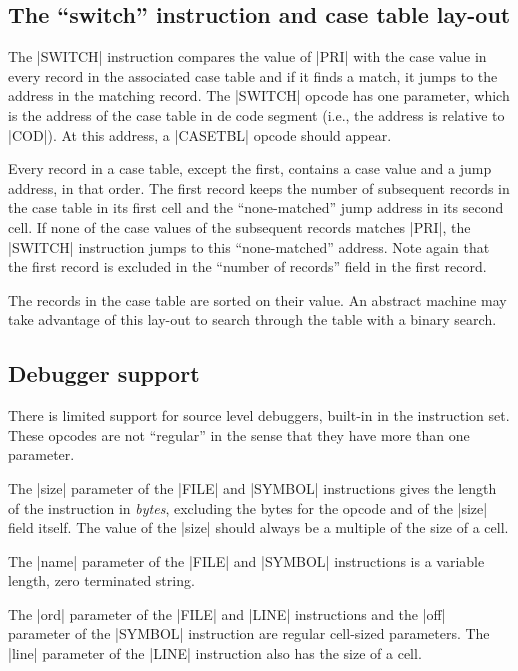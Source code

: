 \subsection{The ``switch'' instruction and case table lay-out}
The |SWITCH| instruction compares the value of |PRI| with the case value in
every record in the associated case table and if it finds a match, it jumps
to the address in the matching record. The |SWITCH| opcode has one parameter,
which is the address of the case table in de code segment (i.e., the address
is relative to |COD|). At this address, a |CASETBL| opcode should appear.

Every record in a case table, except the first, contains a case value and
a jump address, in that order. The first record keeps the number of subsequent
records in the case table in its first cell and the ``none-matched'' jump
address in its second cell. If none of the case values of the subsequent
records matches |PRI|, the |SWITCH| instruction jumps to this ``none-matched''
address. Note again that the first record is excluded in the ``number of
records'' field in the first record.

The records in the case table are sorted on their value. An abstract machine
may take advantage of this lay-out to search through the table with a binary
search.

\subsection{Debugger support}
There is limited support for source level debuggers, built-in in the
instruction set. These opcodes are not ``regular'' in the sense that they
have more than one parameter.

The |size| parameter of the |FILE| and |SYMBOL| instructions gives the length
of the instruction in {\it bytes}, excluding the bytes for the opcode and of
the |size| field itself. The value of the |size| should always be a multiple of
the size of a cell.

The |name| parameter of the |FILE| and |SYMBOL| instructions is a variable
length, zero terminated string.

The |ord| parameter of the |FILE| and |LINE| instructions and the |off|
parameter of the |SYMBOL| instruction are regular cell-sized parameters. The
|line| parameter of the |LINE| instruction also has the size of a cell.

